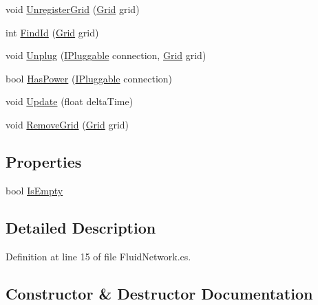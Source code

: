 \begin{DoxyCompactItemize}
\item 
void \hyperlink{class_project_porcupine_1_1_power_network_1_1_fluid_network_a7a0d05eb19a9e37c4f2d080e0b17e246}{Unregister\+Grid} (\hyperlink{class_project_porcupine_1_1_power_network_1_1_grid}{Grid} grid)
\item 
int \hyperlink{class_project_porcupine_1_1_power_network_1_1_fluid_network_ae388b5d0d488a00c5be22e820c45ce20}{Find\+Id} (\hyperlink{class_project_porcupine_1_1_power_network_1_1_grid}{Grid} grid)
\item 
void \hyperlink{class_project_porcupine_1_1_power_network_1_1_fluid_network_a67ba7a46d3ecac00cc9b0d04c50b1244}{Unplug} (\hyperlink{interface_project_porcupine_1_1_power_network_1_1_i_pluggable}{I\+Pluggable} connection, \hyperlink{class_project_porcupine_1_1_power_network_1_1_grid}{Grid} grid)
\item 
bool \hyperlink{class_project_porcupine_1_1_power_network_1_1_fluid_network_a32ce0d32ac824202fd9ac3bb50f37253}{Has\+Power} (\hyperlink{interface_project_porcupine_1_1_power_network_1_1_i_pluggable}{I\+Pluggable} connection)
\item 
void \hyperlink{class_project_porcupine_1_1_power_network_1_1_fluid_network_a227301e509c1183ee799876641e724be}{Update} (float delta\+Time)
\item 
void \hyperlink{class_project_porcupine_1_1_power_network_1_1_fluid_network_a42d6290375015ce893fd75ba5ccc5dca}{Remove\+Grid} (\hyperlink{class_project_porcupine_1_1_power_network_1_1_grid}{Grid} grid)
\end{DoxyCompactItemize}
\subsection*{Properties}
\begin{DoxyCompactItemize}
\item 
bool \hyperlink{class_project_porcupine_1_1_power_network_1_1_fluid_network_a43316477decc4a1215cbc08f32a6da3d}{Is\+Empty}
\end{DoxyCompactItemize}


\subsection{Detailed Description}


Definition at line 15 of file Fluid\+Network.\+cs.



\subsection{Constructor \& Destructor Documentation}
\mbox{\label{class_project_porcupine_1_1_power_network_1_1_fluid_network_a56313c07f89f6cbe4d63e26582936065}} 
